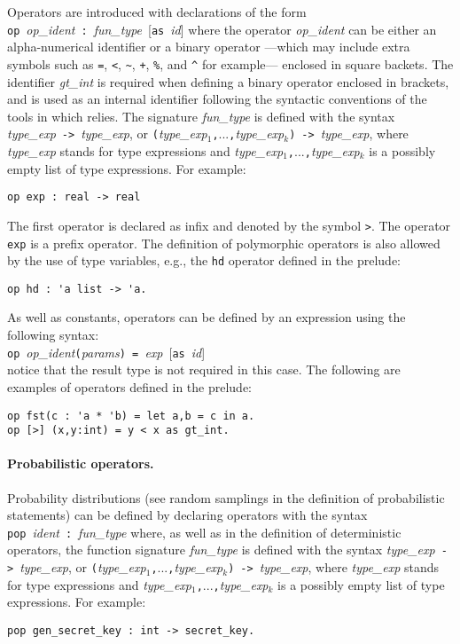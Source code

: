 Operators are introduced with declarations of the form
\verb+op+~\textit{op_ident}~\verb+:+~\textit{fun_type}~[\verb+as+~\textit{id}]
where the operator \textit{op_ident} can be either an alpha-numerical
identifier or a binary operator ---which may include extra symbols
such as \verb'=', \verb'<', \verb'~', \verb'+', \verb'%', and \verb'^'
for example--- enclosed in square backets.  The identifier
\textit{gt_int} is required when defining a binary operator enclosed
in brackets, and is used as an internal identifier following the
syntactic conventions of the tools in which \EasyCrypt relies.  The
signature \textit{fun_type} is defined with the syntax
\textit{type_exp}~\verb+->+~\textit{type_exp}, or
\verb+(+\textit{type_exp}${}_1$\verb+,+...\verb+,+\textit{type_exp}${}_k$\verb+)+~\verb+->+~\textit{type_exp},
where \textit{type_exp} stands for type expressions and 
\textit{type_exp}${}_1$\verb+,+...\verb+,+\textit{type_exp}${}_k$ is a
possibly empty list of type expressions.
%
For example:
\begin{verbatim}
op exp : real -> real
\end{verbatim}
The first operator is declared as infix and denoted by the symbol
\verb|>|. The operator \verb|exp| is a prefix operator. 
%
The definition of polymorphic operators is also allowed by the use of
type variables, e.g., the \verb+hd+ operator defined in the
\EasyCrypt prelude:
\begin{verbatim}
op hd : 'a list -> 'a.
\end{verbatim}
%
As well as constants, operators can be defined by an expression using
the following syntax:
\\
\verb+op+~\textit{op_ident}\verb+(+\textit{params}\verb+) = +\textit{exp}~[\verb+as+~\textit{id}]
\\
\noindent
notice that the result type is not required in this case.
The following are examples of operators defined in the \EasyCrypt prelude:
\begin{verbatim}
op fst(c : 'a * 'b) = let a,b = c in a.
op [>] (x,y:int) = y < x as gt_int.
\end{verbatim}


\paragraph*{Probabilistic operators.}
Probability distributions (see random samplings in the definition of
probabilistic statements) can be defined by declaring operators with
the syntax \verb+pop+~\textit{ident}~\verb+:+~\textit{fun_type} where,
as well as in the definition of deterministic operators, the function
signature \textit{fun_type} is defined with the syntax
\textit{type_exp}~\verb+->+~\textit{type_exp}, or
\verb+(+\textit{type_exp}${}_1$\verb+,+...\verb+,+\textit{type_exp}${}_k$\verb+)+~\verb+->+~\textit{type_exp},
where \textit{type_exp} stands for type expressions and
\textit{type_exp}${}_1$\verb+,+...\verb+,+\textit{type_exp}${}_k$ is a
possibly empty list of type expressions.  For example:
\begin{verbatim}
pop gen_secret_key : int -> secret_key.
\end{verbatim}

